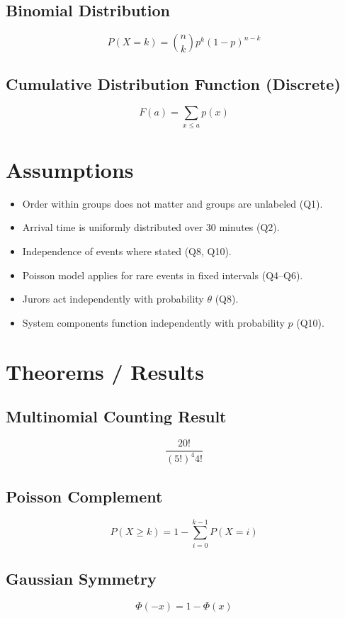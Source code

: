 \documentclass[12pt]{article}
\begin{document}
\subsection*{Binomial Distribution}
\[
P(X = k) = \binom{n}{k} p^k (1-p)^{n-k}
\]

\subsection*{Cumulative Distribution Function (Discrete)}
\[
F(a) = \sum_{x \le a} p(x)
\]

\section*{Assumptions}

\begin{itemize}
\item Order within groups does not matter and groups are unlabeled (Q1).
\item Arrival time is uniformly distributed over 30 minutes (Q2).
\item Independence of events where stated (Q8, Q10).
\item Poisson model applies for rare events in fixed intervals (Q4--Q6).
\item Jurors act independently with probability $\theta$ (Q8).
\item System components function independently with probability $p$ (Q10).
\end{itemize}

\section*{Theorems / Results}

\subsection*{Multinomial Counting Result}
\[
\frac{20!}{(5!)^4 4!}
\]

\subsection*{Poisson Complement}
\[
P(X \ge k) = 1 - \sum_{i=0}^{k-1} P(X=i)
\]

\subsection*{Gaussian Symmetry}
\[
\Phi(-x) = 1 - \Phi(x)
\]
\end{document}
